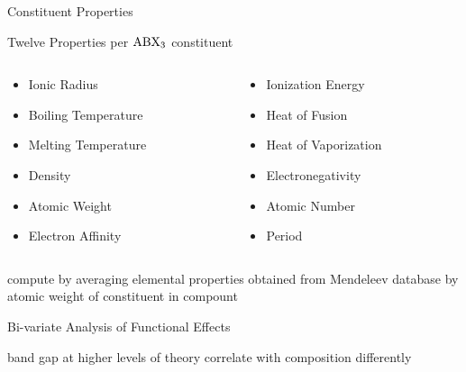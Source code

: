 \documentclass[10pt, aspectratio=169, presentation]{beamer}
\begin{document}
\begin{frame}[label={sec:orgdd89636}]{Constituent Properties}
\begin{block}{Twelve Properties per \(\ce{ABX_3}\) constituent}
\begin{columns}
\begin{column}{0.5\columnwidth}
\begin{itemize}
\item Ionic Radius
\item Boiling Temperature
\item Melting Temperature
\item Density
\item Atomic Weight
\item Electron Affinity
\end{itemize}
\end{column}
\begin{column}{0.5\columnwidth}
\begin{itemize}
\item Ionization Energy
\item Heat of Fusion
\item Heat of Vaporization
\item Electronegativity
\item Atomic Number
\item Period
\end{itemize}
\end{column}
\end{columns}
\end{block}

compute by averaging elemental properties obtained from Mendeleev database
\autocite{mentel-2014}
by atomic weight of constituent in compount
\end{frame}

\begin{frame}[label={sec:orge798a72}]{Bi-variate Analysis of Functional Effects}
 
\begin{center}

\end{center}

band gap at higher levels of theory correlate with composition differently\autocite{yang-2023-high-throug}
\end{frame}
\end{document}

